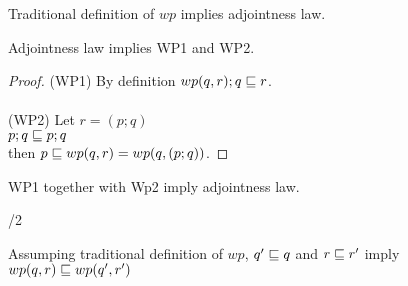 \documentclass{article}
\begin{document}
\verified

\begin{theorem}
Traditional definition of $wp$ implies adjointness law.
\end{theorem}

\verified

\begin{theorem}
Adjointness law implies WP1 and WP2.
\end{theorem}

\verified

\begin{proof}
(WP1) By definition $wp(q, r); q \sqsubseteq r$.\\
\\
(WP2) Let $r = (p; q)$\\
$p; q \sqsubseteq p; q$\\
then $p \sqsubseteq wp(q, r) = wp(q, (p; q))$.
\end{proof}

\begin{theorem}
WP1 together with Wp2 imply adjointness law.
\end{theorem}

/2

\begin{comment}
\begin{proof}
Let $p; q \refines r$.\\
We are to prove $p \refines wp(q, r)$.\\
By definition $wp(q, r) = s$: $s; q \refines r$ and $\forall s' s'; q \refines r \implies s' \refines s$.\\
For $s' = p$ we have $p; q \refines r \implies p \refines s = wp(q, r)$.\\
\\
Let $p \refines wp(q, r)$.\\
We are to prove $p; q \refines r$.\\
$q \refines q$ as $\refines$ is reflexive.\\
By monotonicity of $;$ we have $p; q \refines wp(q, r); q \refines^{WP1} r$.
\end{proof}
\end{comment}


\begin{theorem}[wp monotonicity]
Assumping traditional definition of $wp$,
$q' \sqsubseteq q$ and $r \sqsubseteq r'$ imply $wp(q, r) \sqsubseteq wp(q', r')$
\end{theorem}
\end{document}
